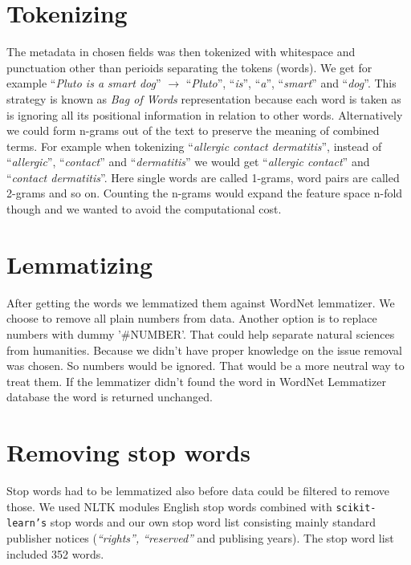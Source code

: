 \section{Tokenizing}
The metadata in chosen fields was then tokenized with whitespace 
and punctuation other than perioids separating the tokens (words). 
We get for example ``\emph{Pluto is a smart dog}'' $\rightarrow$ 
``\emph{Pluto}'', ``\emph{is}'', ``\emph{a}'', ``\emph{smart}'' 
and ``\emph{dog}''. This strategy is known as \emph{Bag of Words} 
representation because each word is taken as is 
ignoring all its positional information in relation to other 
words. 
Alternatively we could form n-grams out of the text to preserve 
the meaning of combined terms. For example when tokenizing 
``\emph{allergic contact dermatitis}'', instead of 
``\emph{allergic}'', ``\emph{contact}'' and 
``\emph{dermatitis}'' we would get ``\emph{allergic contact}'' 
and ``\emph{contact dermatitis}''. Here single words are called 
1-grams, word pairs are called 2-grams and so on. Counting the 
n-grams would expand the feature space n-fold though and we wanted 
to avoid the computational cost. 

\section{Lemmatizing}
After getting the words we lemmatized them against WordNet 
lemmatizer.
We choose to remove all plain numbers from
data. Another option is to replace numbers with dummy '\#NUMBER'.
That could help separate natural sciences from humanities. Because 
we didn't have proper knowledge on the issue removal was chosen. So 
numbers would be ignored. That would be a more neutral way to treat 
them. 
If the lemmatizer didn't found the word in WordNet Lemmatizer 
database the word is returned unchanged. 

\section{Removing stop words}
Stop words had to be lemmatized also before data could be 
filtered to remove those. We used NLTK modules English stop words 
combined with \texttt{scikit-learn's} stop words and our own stop 
word list consisting mainly standard publisher notices 
(\emph{``rights'', ``reserved''} and publising years). The stop 
word list included 352 words.


